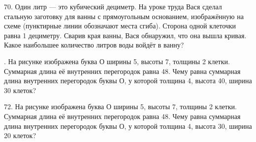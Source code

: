\documentclass[12pt]{article}
\begin{document}
70. Один литр --- это кубический дециметр. На уроке труда Вася сделал стальную заготовку для ванны с прямоугольным основанием, изображённую на схеме (пунктирные линии обозначают места сгиба). Сторона одной клеточки равна 1 дециметру. Сварив края ванны, Вася обнаружил, что она вышла кривая. Какое наибольшее количество литров воды войдёт в ванну?
\begin{center}
\begin{figure}[ht!]
\end{figure}
\end{center}
\newpage
{}. На рисунке изображена буква О ширины 5, высоты 7, толщины 2 клетки. Суммарная длина её внутренних перегородок равна 48. Чему равна суммарная длина внутренних перегородок буквы О, у которой толщина 4, высота 40, ширина 30 клеток?
\begin{center}
\begin{figure}[ht!]
\end{figure}
\end{center}
72. На рисунке изображена буква О ширины 5, высоты 7, толщины 2 клетки. Суммарная длина её внутренних перегородок равна 48. Чему равна суммарная длина внутренних перегородок буквы О, у которой толщина 4, высота 30, ширина 20 клеток?
\end{document}
